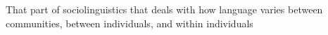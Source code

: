 That part of sociolinguistics that deals with how language varies between communities, between individuals, and within individuals
